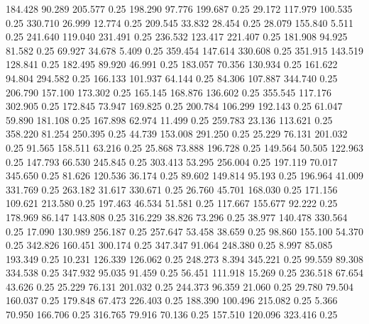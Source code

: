  184.428   90.289  205.577         0.25
 198.290   97.776  199.687         0.25
  29.172  117.979  100.535         0.25
 330.710   26.999   12.774         0.25
 209.545   33.832   28.454         0.25
  28.079  155.840    5.511         0.25
 241.640  119.040  231.491         0.25
 236.532  123.417  221.407         0.25
 181.908   94.925   81.582         0.25
  69.927   34.678    5.409         0.25
 359.454  147.614  330.608         0.25
 351.915  143.519  128.841         0.25
 182.495   89.920   46.991         0.25
 183.057   70.356  130.934         0.25
 161.622   94.804  294.582         0.25
 166.133  101.937   64.144         0.25
  84.306  107.887  344.740         0.25
 206.790  157.100  173.302         0.25
 165.145  168.876  136.602         0.25
 355.545  117.176  302.905         0.25
 172.845   73.947  169.825         0.25
 200.784  106.299  192.143         0.25
  61.047   59.890  181.108         0.25
 167.898   62.974   11.499         0.25
 259.783   23.136  113.621         0.25
 358.220   81.254  250.395         0.25
  44.739  153.008  291.250         0.25
  25.229   76.131  201.032         0.25
  91.565  158.511   63.216         0.25
  25.868   73.888  196.728         0.25
 149.564   50.505  122.963         0.25
 147.793   66.530  245.845         0.25
 303.413   53.295  256.004         0.25
 197.119   70.017  345.650         0.25
  81.626  120.536   36.174         0.25
  89.602  149.814   95.193         0.25
 196.964   41.009  331.769         0.25
 263.182   31.617  330.671         0.25
  26.760   45.701  168.030         0.25
 171.156  109.621  213.580         0.25
 197.463   46.534   51.581         0.25
 117.667  155.677   92.222         0.25
 178.969   86.147  143.808         0.25
 316.229   38.826   73.296         0.25
  38.977  140.478  330.564         0.25
  17.090  130.989  256.187         0.25
 257.647   53.458   38.659         0.25
  98.860  155.100   54.370         0.25
 342.826  160.451  300.174         0.25
 347.347   91.064  248.380         0.25
   8.997   85.085  193.349         0.25
  10.231  126.339  126.062         0.25
 248.273    8.394  345.221         0.25
  99.559   89.308  334.538         0.25
 347.932   95.035   91.459         0.25
  56.451  111.918   15.269         0.25
 236.518   67.654   43.626         0.25
  25.229   76.131  201.032         0.25
 244.373   96.359   21.060         0.25
  29.780   79.504  160.037         0.25
 179.848   67.473  226.403         0.25
 188.390  100.496  215.082         0.25
   5.366   70.950  166.706         0.25
 316.765   79.916   70.136         0.25
 157.510  120.096  323.416         0.25
